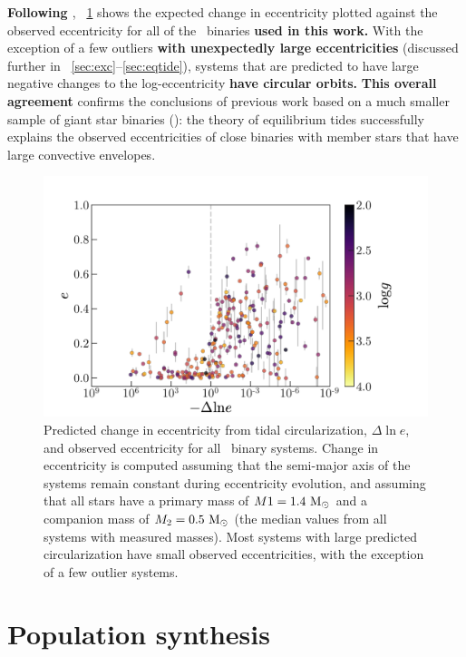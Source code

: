 \documentclass[modern, letterpaper]{aastex62}
\newcommand{\apogee}{\project{\acronym{APOGEE}}}
\renewcommand{\changes}[1]{\textbf{#1}}
\begin{document}
\changes{Following \citet{Verbunt:1995}}, \figurename~\ref{fig:dlne} shows the expected change in eccentricity plotted against the observed eccentricity for all of the \apogee\ binaries \changes{used in this work.}
With the exception of a few outliers \changes{with unexpectedly large eccentricities} (discussed further in \sectionname~\ref{sec:exc}--\ref{sec:eqtide}), systems that are predicted to have large negative changes to the log-eccentricity \changes{have circular orbits.}
\changes{This overall agreement} confirms the conclusions of previous work based on a much smaller sample of giant star binaries (\citealt{Verbunt:1995}): the theory of equilibrium tides successfully explains the observed eccentricities of close binaries with member stars that have large convective envelopes.

\begin{figure}[h]
\begin{center}
\includegraphics[width=\textwidth]{dlne}
\end{center}
\caption{%
Predicted change in eccentricity from tidal circularization, $\Delta \ln e$, and
observed eccentricity for all \apogee\ binary systems.
Change in eccentricity is computed assuming that the semi-major axis of the
systems remain constant during eccentricity evolution, and assuming that all
stars have a primary mass of $M1 = 1.4~\mathrm{M}_\odot$ and a companion mass of $M_2 =
0.5~\mathrm{M}_\odot$ (the median values from all systems with measured masses).
Most systems with large predicted circularization have small observed
eccentricities, with the exception of a few outlier systems.
\label{fig:dlne}
}
\end{figure}


\section{Population synthesis}
\label{sec:theory}
\end{document}
